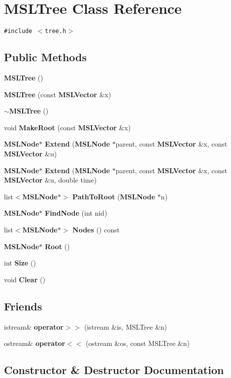 \section{MSLTree  Class Reference}
\label{class_MSLTree}
{\tt \#include $<$tree.h$>$}

\subsection*{Public Methods}
\begin{CompactItemize}
\item 
{\bf MSLTree} ()
\item 
{\bf MSLTree} (const {\bf MSLVector} \&x)
\item 
{\bf $\sim$MSLTree} ()
\item 
void {\bf Make\-Root} (const {\bf MSLVector} \&x)
\item 
{\bf MSLNode}$\ast$ {\bf Extend} ({\bf MSLNode} $\ast$parent, const {\bf MSLVector} \&x, const {\bf MSLVector} \&u)
\item 
{\bf MSLNode}$\ast$ {\bf Extend} ({\bf MSLNode} $\ast$parent, const {\bf MSLVector} \&x, const {\bf MSLVector} \&u, double time)
\item 
list$<${\bf MSLNode}$\ast$$>$ {\bf Path\-To\-Root} ({\bf MSLNode} $\ast$n)
\item 
{\bf MSLNode}$\ast$ {\bf Find\-Node} (int nid)
\item 
list$<${\bf MSLNode}$\ast$$>$ {\bf Nodes} () const
\item 
{\bf MSLNode}$\ast$ {\bf Root} ()
\item 
int {\bf Size} ()
\item 
void {\bf Clear} ()
\end{CompactItemize}
\subsection*{Friends}
\begin{CompactItemize}
\item 
istream\& {\bf operator$>$$>$} (istream \&is, MSLTree \&n)
\item 
ostream\& {\bf operator$<$$<$} (ostream \&os, const MSLTree \&n)
\end{CompactItemize}


\subsection{Constructor \& Destructor Documentation}

